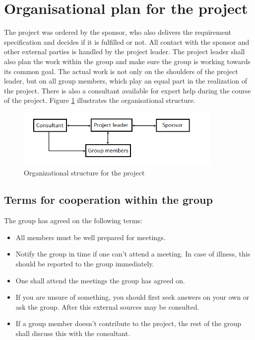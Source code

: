 \section{Organisational plan for the project}
The project was ordered by the sponsor, who also delivers the requirement specification and decides if it is fulfilled or not. All contact with the sponsor and other external parties is handled by the project leader. The project leader shall also plan the work within the group and make sure the group is working towards its common goal. The actual work is not only on the shoulders of the project leader, but on all group members, which play an equal part in the realization of the project. There is also a consultant available for expert help during the course of the project. Figure \ref{organisationsplan} illustrates the organisational structure.

\begin{figure}[H]
  \begin{center}
    \includegraphics[keepaspectratio=true,width=375px]{grafik/organisationsplan.png}
    \caption{Organizational structure for the project}
    \label{organisationsplan}
  \end{center}
\end{figure}

\subsection{Terms for cooperation within the group}
The group has agreed on the following terms:

\begin{itemize}
\item{All members must be well prepared for meetings.}
\item{Notify the group in time if one can't attend a meeting. In case of illness, this should be reported to the group immediately.}
\item{One shall attend the meetings the group has agreed on.}
\item{If you are unsure of something, you should first seek answers on your own or ask the group. After this external sources may be consulted.}
\item{If a group member doesn't contribute to the project, the rest of the group shall discuss this with the consultant.}
\end{itemize}

\newpage

